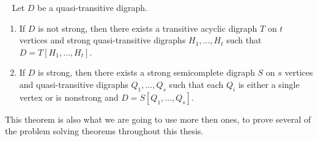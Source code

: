 \begin{thm}~\cite{bangJGT2}
    Let $D$ be a quasi-transitive digraph.
    \label{thm:quasidecom}
    \begin{enumerate}
        \item If $D$ is not strong, then there exists a transitive acyclic digraph $T$ on $t$ vertices and strong quasi-transitive digraphs $H_1,\dots,H_t$ such that $D=T[H_1,\dots,H_t]$.
        \item If $D$ is strong, then there exists a strong semicomplete digraph $S$ on $s$ vertices and quasi-transitive digraphs $Q_1,\dots ,Q_s$ such that each $Q_i$ is either a single vertex or is nonstrong and $D=S[Q_1,\dots,Q_s]$.
    \end{enumerate}
\end{thm}
This theorem is also what we are going to use more then ones, to prove several of the problem solving theorems throughout this thesis.
